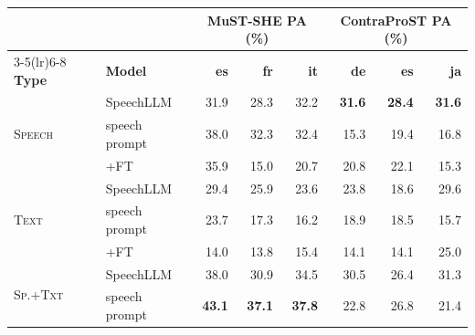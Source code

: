 \begin{table}[t]
\centering
\footnotesize
\setlength{\tabcolsep}{4pt}
\begin{tabular}{ll|rrr|rrr}
\toprule
 & & \multicolumn{3}{c|}{\textbf{MuST-SHE PA (\%)}} & \multicolumn{3}{c}{\textbf{ContraProST PA (\%)}} \\
\cmidrule(lr){3-5}\cmidrule(lr){6-8}
\textbf{Type} & \textbf{Model} & \textbf{es} & \textbf{fr} & \textbf{it} & \textbf{de} & \textbf{es} & \textbf{ja} \\
\midrule
\multirow{3}{*}{\textsc{Speech}} & SpeechLLM & \cellcolor[RGB]{255,255,255}31.9 & \cellcolor[RGB]{255,255,255}28.3 & \cellcolor[RGB]{255,255,255}32.2 & \cellcolor[RGB]{255,255,255}\textbf{31.6} & \cellcolor[RGB]{255,255,255}\textbf{28.4} & \cellcolor[RGB]{255,255,255}\textbf{31.6} \\
 & \quad speech prompt & \cellcolor[RGB]{255,255,255}38.0 & \cellcolor[RGB]{255,255,255}32.3 & \cellcolor[RGB]{255,255,255}32.4 & \cellcolor[RGB]{255,255,255}15.3 & \cellcolor[RGB]{255,255,255}19.4 & \cellcolor[RGB]{255,255,255}16.8 \\
 & \quad+FT & \cellcolor[RGB]{255,255,255}35.9 & \cellcolor[RGB]{255,255,255}15.0 & \cellcolor[RGB]{255,255,255}20.7 & \cellcolor[RGB]{255,255,255}20.8 & \cellcolor[RGB]{255,255,255}22.1 & \cellcolor[RGB]{255,255,255}15.3 \\
\midrule
\multirow{3}{*}{\textsc{Text}} & SpeechLLM & \cellcolor[RGB]{255,255,255}29.4 & \cellcolor[RGB]{255,255,255}25.9 & \cellcolor[RGB]{255,255,255}23.6 & \cellcolor[RGB]{255,255,255}23.8 & \cellcolor[RGB]{255,255,255}18.6 & \cellcolor[RGB]{255,255,255}29.6 \\
 & \quad speech prompt & \cellcolor[RGB]{255,255,255}23.7 & \cellcolor[RGB]{255,255,255}17.3 & \cellcolor[RGB]{255,255,255}16.2 & \cellcolor[RGB]{255,255,255}18.9 & \cellcolor[RGB]{255,255,255}18.5 & \cellcolor[RGB]{255,255,255}15.7 \\
 & \quad+FT & \cellcolor[RGB]{255,255,255}14.0 & \cellcolor[RGB]{255,255,255}13.8 & \cellcolor[RGB]{255,255,255}15.4 & \cellcolor[RGB]{255,255,255}14.1 & \cellcolor[RGB]{255,255,255}14.1 & \cellcolor[RGB]{255,255,255}25.0 \\
\midrule
\multirow{3}{*}{\textsc{Sp.+Txt}} & SpeechLLM & \cellcolor[RGB]{255,255,255}38.0 & \cellcolor[RGB]{255,255,255}30.9 & \cellcolor[RGB]{255,255,255}34.5 & \cellcolor[RGB]{255,255,255}30.5 & \cellcolor[RGB]{255,255,255}26.4 & \cellcolor[RGB]{255,255,255}31.3 \\
 & \quad speech prompt & \cellcolor[RGB]{255,255,255}\textbf{43.1} & \cellcolor[RGB]{255,255,255}\textbf{37.1} & \cellcolor[RGB]{255,255,255}\textbf{37.8} & \cellcolor[RGB]{255,255,255}22.8 & \cellcolor[RGB]{255,255,255}26.8 & \cellcolor[RGB]{255,255,255}21.4 \\

\end{tabular}
\end{table}
